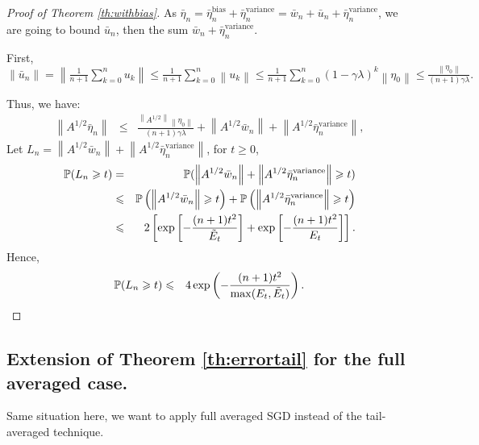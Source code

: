 \begin{proof}[Proof of Theorem \ref{th:withbias}]
As $\bar{\eta}_n = \bar{\eta}_n^{\textrm {bias}} + \bar{\eta}_n^{\textrm {variance}} = \bar{w}_n + \bar{u}_n +  \bar{\eta}_n^{\textrm {variance}}$, we are going to bound $\bar{u}_n$, then the sum $\bar{w}_n + \bar{\eta}_n^{\textrm {variance}}$.

First, $\displaystyle \|\bar{u}_n\| = \left\| \frac{1}{n+1} \sum_{k=0}^n u_k\right\|\leqslant \frac{1}{n+1} \sum_{k=0}^n \left\| u_k\right\|\leqslant \frac{1}{n+1} \sum_{k=0}^n (1-\gamma\lambda)^k\left\| \eta_0\right\|\leqslant \frac{\left\| \eta_0\right\|}{(n+1)\gamma\lambda} .$

Thus, we have:
\begin{eqnarray*}
\left\| A^{1/2}\bar{\eta}_n \right\| &\leqslant & \frac{ \left\| A^{1/2} \right\|\left\| \eta_0\right\|}{(n+1)\gamma\lambda} + \left\|A^{1/2}\bar{w}_n\right\| + \left\|A^{1/2}\bar{\eta}_n^{\textrm {variance}}\right\|,
\end{eqnarray*} 
Let $L_n = \left\|A^{1/2}\bar{w}_n\right\| + \left\|A^{1/2}\bar{\eta}_n^{\textrm {variance}}\right\|$, for $t \geqslant 0$,
\begin{eqnarray*}
\P(L_n \geqslant t ) &=& \P(\left\|A^{1/2}\bar{w}_n\right\| + \left\|A^{1/2}\bar{\eta}_n^{\textrm {variance}}\right\| \geqslant t ) \\
&\leqslant& \P\left(\left\|A^{1/2}\bar{w}_n\right\| \geqslant t\right)+\P\left( \left\|A^{1/2}\bar{\eta}_n^{\textrm {variance}}\right\| \geqslant t \right) \\
&\leqslant& 2\left[\exp\left[-\frac{(n+1) t^2}{\tilde{E}_t}\right] + \exp\left[-\frac{(n+1) t^2}{E_t}\right]\right] .
\end{eqnarray*}
Hence,
\begin{eqnarray*}
\P(L_n \geqslant t ) &\leqslant& 4 \exp\left(-\frac{(n+1) t^2}{\max(E_t,\tilde{E}_t)} \right). 
\end{eqnarray*}


\end{proof}

\subsection{Extension of Theorem \ref{th:errortail} for the full averaged case.}
\label{ap:EXPfullaverage}


Same situation here, we want to apply full averaged SGD instead of the tail-averaged technique. 

